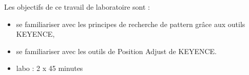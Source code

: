 \noindent Les objectifs de ce travail de laboratoire sont :
\begin{itemize}
\item se familiariser avec les principes de recherche de pattern grâce aux outils KEYENCE,
\item se familiariser avec les outils de Position Adjust de KEYENCE.
\end{itemize}
\vspace{0.5cm}

\begin{itemize}
\item labo : 2 x 45 minutes\\
\end{itemize}
